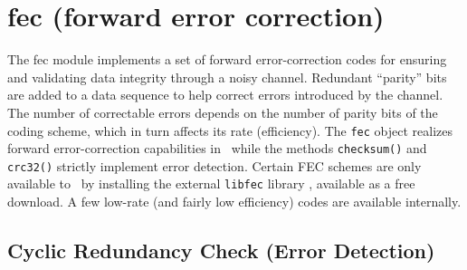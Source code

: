 % 
%

\newpage
\section{fec (forward error correction)}
\label{module:fec}
The fec module implements a set of forward error-correction codes for
ensuring and validating data integrity through a noisy channel.
Redundant ``parity'' bits are added to a data sequence to help correct
errors introduced by the channel.
The number of correctable errors depends on the number of parity bits of the
coding scheme, which in turn affects its rate (efficiency).
The {\tt fec} object realizes forward error-correction capabilities in
\liquid\ while the methods {\tt checksum()} and {\tt crc32()} strictly
implement error detection.
Certain FEC schemes are only available to \liquid\ by installing the external
{\tt libfec} library \cite{libfec:web}, available as a free download.
A few low-rate (and fairly low efficiency) codes are available internally.


\subsection{Cyclic Redundancy Check (Error Detection)}
\label{module:fec:crc}

